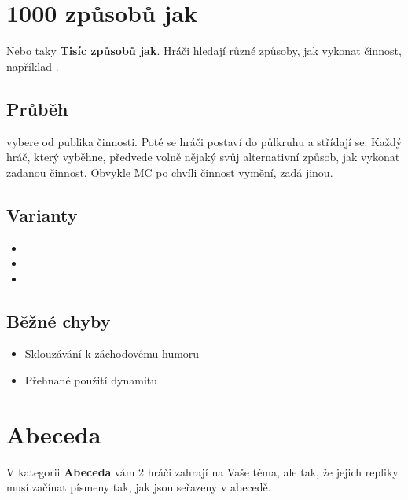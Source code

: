\needspace{5cm} \section{1000 způsobů jak} \label{1000 způsobů jak}  
 
 
Nebo taky \textbf{Tisíc způsobů jak}{}. Hráči hledají různé způsoby, jak vykonat činnost, například . 
 
 
\subsection{Průběh}  
 vybere od publika činnosti. Poté se hráči postaví do půlkruhu a střídají se. Každý hráč, který vyběhne, předvede volně nějaký svůj alternativní způsob, jak vykonat zadanou činnost. Obvykle MC po chvíli činnost vymění, zadá jinou. 
 
\subsection{ Varianty } \begin{itemize}
\item  {}
\item  {}
\item  {}
\end{itemize}
 
\subsection{ Běžné chyby } \begin{itemize}
\item Sklouzávání k záchodovému humoru
\item Přehnané použití dynamitu
\end{itemize}
 
 
 
 
 
\needspace{5cm} \section{Abeceda} \label{abeceda}  
 
V kategorii \textbf{Abeceda}{} vám 2 hráči zahrají na Vaše téma, ale tak, že jejich repliky musí začínat písmeny tak, jak jsou seřazeny v abecedě. 
 

